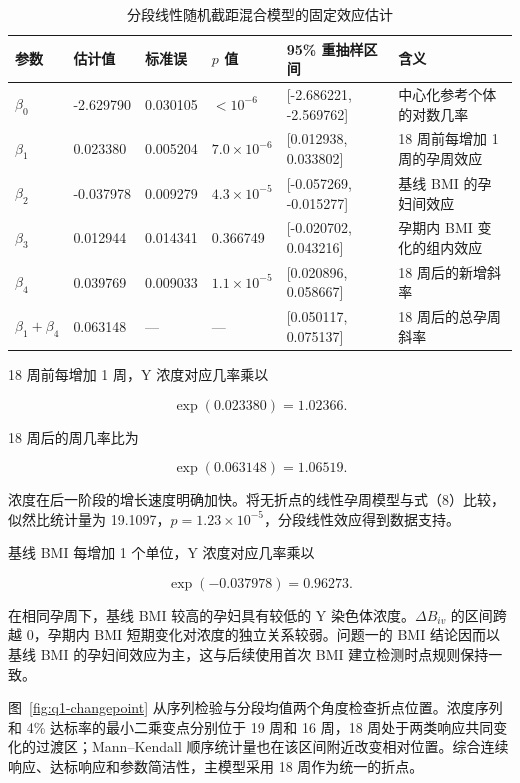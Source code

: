 \documentclass[UTF8,fontset=fandol,zihao=-4,a4paper]{ctexart}
\begin{document}
\begin{table}[!htbp]
  \centering
  \caption{分段线性随机截距混合模型的固定效应估计}
  \label{tab:q1-fixed-effects}
  \scriptsize
  \setlength{\tabcolsep}{3.2pt}
  \begin{tabularx}{\textwidth}{@{}Q{1.25cm}Q{1.55cm}Q{1.55cm}Q{1.65cm}Q{3.0cm}X@{}}
    \toprule
    参数 & 估计值 & 标准误 & \(p\) 值 & 95\% 重抽样区间 & 含义 \\
    \midrule
    \(\beta_0\) & -2.629790 & 0.030105 & \(<10^{-6}\) & [-2.686221, -2.569762] & 中心化参考个体的对数几率 \\
    \(\beta_1\) & 0.023380 & 0.005204 & \(7.0\times10^{-6}\) & [0.012938, 0.033802] & 18 周前每增加 1 周的孕周效应 \\
    \(\beta_2\) & -0.037978 & 0.009279 & \(4.3\times10^{-5}\) & [-0.057269, -0.015277] & 基线 BMI 的孕妇间效应 \\
    \(\beta_3\) & 0.012944 & 0.014341 & 0.366749 & [-0.020702, 0.043216] & 孕期内 BMI 变化的组内效应 \\
    \(\beta_4\) & 0.039769 & 0.009033 & \(1.1\times10^{-5}\) & [0.020896, 0.058667] & 18 周后的新增斜率 \\
    \(\beta_1+\beta_4\) & 0.063148 & --- & --- & [0.050117, 0.075137] & 18 周后的总孕周斜率 \\
    \bottomrule
  \end{tabularx}
\end{table}

18 周前每增加 1 周，Y 浓度对应几率乘以

\[
\exp(0.023380)=1.02366.
\tag{11}
\]

18 周后的周几率比为

\[
\exp(0.063148)=1.06519.
\tag{12}
\]

浓度在后一阶段的增长速度明确加快。将无折点的线性孕周模型与式（8）比较，似然比统计量为
19.1097，\(p=1.23\times10^{-5}\)，分段线性效应得到数据支持。

基线 BMI 每增加 1 个单位，Y 浓度对应几率乘以

\[
\exp(-0.037978)=0.96273.
\tag{13}
\]

在相同孕周下，基线 BMI 较高的孕妇具有较低的 Y
染色体浓度。\(\Delta B_{iv}\) 的区间跨越 0，孕期内 BMI
短期变化对浓度的独立关系较弱。问题一的 BMI 结论因而以基线 BMI
的孕妇间效应为主，这与后续使用首次 BMI 建立检测时点规则保持一致。

图~\ref{fig:q1-changepoint} 从序列检验与分段均值两个角度检查折点位置。浓度序列和 4\% 达标率的最小二乘变点分别位于 19 周和 16 周，18 周处于两类响应共同变化的过渡区；Mann--Kendall 顺序统计量也在该区间附近改变相对位置。综合连续响应、达标响应和参数简洁性，主模型采用 18 周作为统一的折点。
\end{document}
